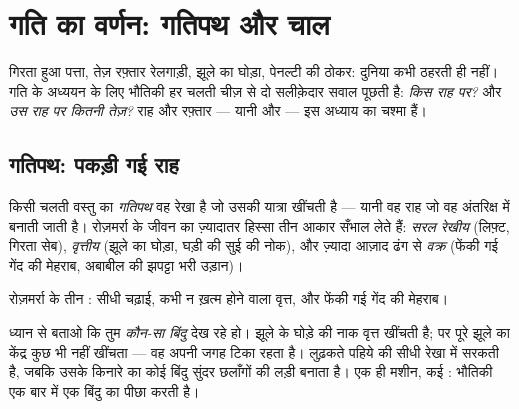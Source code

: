 \chapter{गति का वर्णन: गतिपथ और चाल}\label{ch:g6:describing-motion}

गिरता हुआ पत्ता, तेज़ रफ़्तार रेलगाड़ी, झूले का घोड़ा, पेनल्टी की
ठोकर: दुनिया कभी ठहरती ही नहीं। गति के अध्ययन के लिए भौतिकी हर चलती
चीज़ से दो सलीक़ेदार सवाल पूछती है: \emph{किस राह पर?} और \emph{उस राह
पर कितनी तेज़?} राह और रफ़्तार --- यानी  और  --- इस अध्याय का
चश्मा हैं।

\section{गतिपथ: पकड़ी गई राह}

\begin{definition}[गतिपथ]\label{def:g6:describing-motion:trajectory}
किसी चलती वस्तु का \emph{गतिपथ} वह रेखा है जो उसकी
यात्रा खींचती है --- यानी वह राह जो वह अंतरिक्ष में बनाती जाती है।
रोज़मर्रा के जीवन का ज़्यादातर हिस्सा तीन आकार सँभाल लेते हैं:
\emph{सरल रेखीय} (लिफ़्ट, गिरता सेब),
\emph{वृत्तीय} (झूले का घोड़ा, घड़ी की सुई की
नोक), और ज़्यादा आज़ाद ढंग से \emph{वक्र} (फेंकी गई गेंद की मेहराब,
अबाबील की झपट्टा भरी उड़ान)।
\end{definition}

\begin{omfigure}

{\small रोज़मर्रा के तीन : सीधी चढ़ाई, कभी न ख़त्म होने वाला
वृत्त, और फेंकी गई गेंद की मेहराब।}
\end{omfigure}

\begin{example}[किसका गतिपथ?]\label{ex:g6:describing-motion:whose}
ध्यान से बताओ कि तुम \emph{कौन-सा बिंदु} देख रहे हो। झूले के घोड़े की
नाक वृत्त खींचती है; पर पूरे झूले का केंद्र कुछ भी नहीं खींचता --- वह
अपनी जगह टिका रहता है। लुढ़कते पहिये की  सीधी रेखा में सरकती है,
जबकि उसके किनारे का कोई बिंदु सुंदर छलाँगों की लड़ी बनाता है। एक ही
मशीन, कई : भौतिकी एक बार में एक बिंदु का पीछा करती है।
\end{example}

